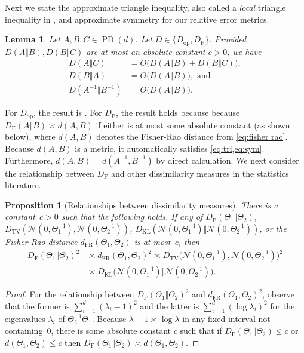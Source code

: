 \documentclass[aos]{imsart}
\newtheorem{prop}[theorem]{Proposition}
\newtheorem{lemma}[theorem]{Lemma}
\theoremstyle{definition}
\numberwithin{equation}{section}
\DeclareMathOperator{\PD}{PD}
\newcommand{\DF}{D_{\operatorname{F}}}
\newcommand{\Dop}{D_{\operatorname{op}}}
\newcommand{\DKL}{D_{\operatorname{KL}}}
\newcommand{\DTV}{D_{\operatorname{TV}}}
\newcommand{\dFR}{d_{\operatorname{FR}}}
\begin{document}
\begin{appendix}
Next we state the approximate triangle inequality, also called a \emph{local} triangle inequality in \cite{yang1999information}, and approximate symmetry for our relative error metrics.

\begin{lemma}\label{lem:triangle-ineq}
Let $A, B, C \in \PD(d)$.
Let $D \in \{\Dop, \DF\}$. Provided $D(A\Vert B), D(B\Vert C)$ are at most an absolute constant $c>0$, we have
\begin{align}
  D(A\Vert C) &= O\bigl( D(A\Vert B) + D(B\Vert C) \bigr),\label{eq:tri}\\
  D(B\Vert A) &= O\bigl( D(A\Vert B) \bigr),\label{eq:sym} \text{ and }\\
  D(A^{-1}\Vert B^{-1}) &= O\bigl( D(A\Vert B) \bigr).
\end{align}
\end{lemma}

For $\Dop$, the result is \cite[Lemma~C.1]{FM20}.
For $\DF$, the result holds because because $\DF(A\Vert  B) \asymp d(A, B)$ if either is at most some absolute constant (as shown below), where $d(A, B)$ denotes the Fisher-Rao distance from \cref{eq:fisher rao}.
Because $d(A, B)$ is a metric, it automatically satisfies \cref{eq:tri,eq:sym}. Furthermore, $d(A,B) = d(A^{-1}, B^{-1})$ by direct calculation.
We next consider the relationship between $\DF$ and other dissimilarity measures in the statistics literature.

\begin{prop}[Relationships between dissimilarity measures]\label{prop:dissimilarities}
There is a constant~$c > 0$ such that the following holds.
If any of
$\DF(\Theta_1\Vert  \Theta_2)$,
$\DTV(\mathcal{N}(0, \Theta_1^{-1}), \mathcal{N}(0, \Theta_2^{-1}))$,
$\DKL(\mathcal{N}(0, \Theta_1^{-1}) \Vert  \mathcal{N}(0, \Theta_2^{-1}))$,
or the Fisher-Rao distance $\dFR(\Theta_1, \Theta_2)$
is at most~$c$, then
\begin{align*}
  \DF(\Theta_1\Vert  \Theta_2)^2
&\asymp \dFR(\Theta_1, \Theta_2)^2
\asymp \DTV\bigl(\mathcal{N}(0, \Theta_1^{-1}), \mathcal{N}(0, \Theta_2^{-1})\bigr)^2 \\
&\asymp \DKL\bigl(\mathcal{N}(0, \Theta_1^{-1}) \Vert  \mathcal{N}(0, \Theta_2^{-1})\bigr).
\end{align*}
\end{prop}
\begin{proof}
For the relationship between $\DF(\Theta_1\Vert  \Theta_2)^2$ and $\dFR(\Theta_1, \Theta_2)^2$, observe that the former is $\sum_{i = 1}^d (\lambda_i - 1)^2$ and the latter is $\sum_{i = 1}^d (\log \lambda_i)^2$ for the eigenvalues $\lambda_i$ of $\Theta_2^{-1} \Theta_1$. Because $\lambda-1 \asymp \log \lambda$ in any fixed interval not containing~$0$, there is some absolute constant $c$ such that if $\DF(\Theta_1 \Vert  \Theta_2) \leq c$ or $d(\Theta_1, \Theta_2) \leq c$ then $\DF(\Theta_1 \Vert  \Theta_2) \asymp d(\Theta_1, \Theta_2)$.


\end{proof}
\end{appendix}
\end{document}
